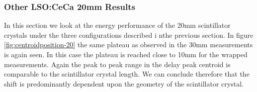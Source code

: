 \subsubsection{Other LSO:CeCa 20mm Results}
In this section we look at the energy performance of the 20mm scintillator crystals under the three configurations described i nthe previous section. In figure \ref{fig:centroidposition-20} the same plateau as observed in the 30mm measurements is again seen. In this case the plateau is reached close to 10mm for the wrapped measurements. Again the peak to peak range in the delay peak centroid is comparable to the scintillator crystal length. We can conclude therefore that the shift is predominantly dependent upon the geometry of the scintillator crystal. 